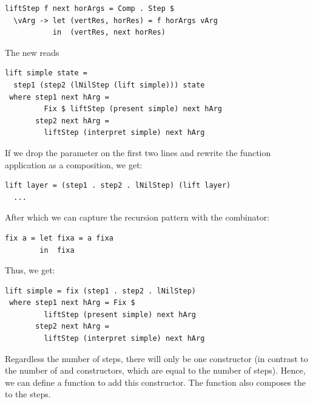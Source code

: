 \documentclass[preprint,natbib]{sigplanconf}
\begin{document}
\begin{small} %
\begin{verbatim}
liftStep f next horArgs = Comp . Step $ 
  \vArg -> let (vertRes, horRes) = f horArgs vArg
           in  (vertRes, next horRes)
\end{verbatim}%
\end{small}

The new  reads

\begin{small} %
\begin{verbatim}
lift simple state =
  step1 (step2 (lNilStep (lift simple))) state
 where step1 next hArg = 
         Fix $ liftStep (present simple) next hArg
       step2 next hArg =
         liftStep (interpret simple) next hArg 
\end{verbatim}%
\end{small}



If we drop the  parameter on the first two lines and rewrite the function application as a composition, we get:
\
\begin{small}
\begin{verbatim}
lift layer = (step1 . step2 . lNilStep) (lift layer)
  ...
\end{verbatim}
\end{small}

After which we can capture the recursion pattern with the  combinator:

\begin{small}
\begin{verbatim}
fix a = let fixa = a fixa
        in  fixa
\end{verbatim}
\end{small}

Thus, we get:

\begin{small} %
\begin{verbatim}
lift simple = fix (step1 . step2 . lNilStep)
 where step1 next hArg = Fix $
         liftStep (present simple) next hArg
       step2 next hArg =
         liftStep (interpret simple) next hArg
\end{verbatim}
\end{small}%


Regardless the number of steps, there will only be one  constructor (in contrast to the number of  and  constructors, which are equal to the number of steps). Hence, we can define a function  to add this constructor. The function  also composes the  to the steps. 
\end{document}
